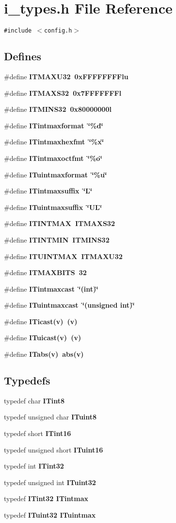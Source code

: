 \section{i\_\-types.h File Reference}
\label{i__types_8h}
{\tt \#include $<$config.h$>$}\par
\subsection*{Defines}
\begin{CompactItemize}
\item 
\#define \bf{ITMAXU32}~0x\-FFFFFFFFlu
\item 
\#define \bf{ITMAXS32}~0x7FFFFFFFl
\item 
\#define \bf{ITMINS32}~0x80000000l
\item 
\#define \bf{ITintmaxformat}~\char`\"{}\%d\char`\"{}
\item 
\#define \bf{ITintmaxhexfmt}~\char`\"{}\%x\char`\"{}
\item 
\#define \bf{ITintmaxoctfmt}~\char`\"{}\%o\char`\"{}
\item 
\#define \bf{ITuintmaxformat}~\char`\"{}\%u\char`\"{}
\item 
\#define \bf{ITintmaxsuffix}~\char`\"{}L\char`\"{}
\item 
\#define \bf{ITuintmaxsuffix}~\char`\"{}UL\char`\"{}
\item 
\#define \bf{ITINTMAX}~ITMAXS32
\item 
\#define \bf{ITINTMIN}~ITMINS32
\item 
\#define \bf{ITUINTMAX}~ITMAXU32
\item 
\#define \bf{ITMAXBITS}~32
\item 
\#define \bf{ITintmaxcast}~\char`\"{}(int)\char`\"{}
\item 
\#define \bf{ITuintmaxcast}~\char`\"{}(unsigned int)\char`\"{}
\item 
\#define \bf{ITicast}(v)~(v)
\item 
\#define \bf{ITuicast}(v)~(v)
\item 
\#define \bf{ITabs}(v)~abs(v)
\end{CompactItemize}
\subsection*{Typedefs}
\begin{CompactItemize}
\item 
typedef char \bf{ITint8}
\item 
typedef unsigned char \bf{ITuint8}
\item 
typedef short \bf{ITint16}
\item 
typedef unsigned short \bf{ITuint16}
\item 
typedef int \bf{ITint32}
\item 
typedef unsigned int \bf{ITuint32}
\item 
typedef \bf{ITint32} \bf{ITintmax}
\item 
typedef \bf{ITuint32} \bf{ITuintmax}
\end{CompactItemize}
